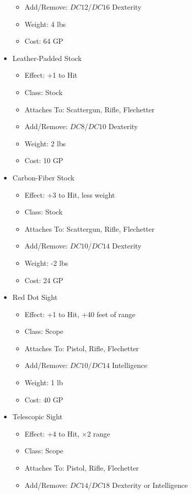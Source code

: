 \documentclass[12pt, landscape]{article}
\begin{document}
\begin{FlushLeft}
\begin{multicols}{2}
\begin{itemize}[wide]
\begin{itemize}
					\item Add/Remove: $DC12$/$DC16$ Dexterity
					\item Weight: 4 lbs
					\item Cost: 64 GP
				\end{itemize}
				\item Leather-Padded Stock
				\begin{itemize}
					\item Effect: +1 to Hit
					\item Class: Stock
					\item Attaches To: Scattergun, Rifle, Flechetter
					\item Add/Remove: $DC8$/$DC10$ Dexterity
					\item Weight: 2 lbs
					\item Cost: 10 GP
				\end{itemize}
				\item Carbon-Fiber Stock
				\begin{itemize}
					\item Effect: +3 to Hit, less weight
					\item Class: Stock
					\item Attaches To: Scattergun, Rifle, Flechetter
					\item Add/Remove: $DC10$/$DC14$ Dexterity
					\item Weight: -2 lbs
					\item Cost: 24 GP
				\end{itemize}
				\vfill \null \columnbreak
				\item Red Dot Sight
				\begin{itemize}
					\item Effect: +1 to Hit, +40 feet of range
					\item Class: Scope
					\item Attaches To: Pistol, Rifle, Flechetter
					\item Add/Remove: $DC10$/$DC14$ Intelligence
					\item Weight: 1 lb
					\item Cost: 40 GP
				\end{itemize}
				\item Telescopic Sight
				\begin{itemize}
					\item Effect: +4 to Hit, $\times$2 range
					\item Class: Scope
					\item Attaches To: Pistol, Rifle, Flechetter
					\item Add/Remove: $DC14$/$DC18$ Dexterity or Intelligence

\end{itemize}
\end{itemize}
\end{multicols}
\end{FlushLeft}
\end{document}
